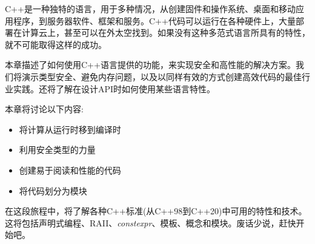
C++是一种独特的语言，用于多种情况，从创建固件和操作系统、桌面和移动应用程序，到服务器软件、框架和服务。C++代码可以运行在各种硬件上，大量部署在计算云上，甚至可以在外太空找到。如果没有这种多范式语言所具有的特性，就不可能取得这样的成功。

本章描述了如何使用C++语言提供的功能，来实现安全和高性能的解决方案。我们将演示类型安全、避免内存问题，以及以同样有效的方式创建高效代码的最佳行业实践。还将了解在设计API时如何使用某些语言特性。

本章将讨论以下内容:

\begin{itemize}
\item 将计算从运行时移到编译时
\item 利用安全类型的力量
\item 创建易于阅读和性能的代码
\item 将代码划分为模块
\end{itemize}

在这段旅程中，将了解各种C++标准(从C++98到C++20)中可用的特性和技术。这将包括声明式编程、RAII、\textit{constexpr}、模板、概念和模块。废话少说，赶快开始吧。






